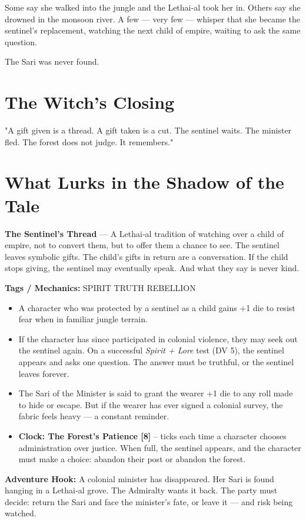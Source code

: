 \documentclass[10pt,twoside]{book}
\newcommand{\tag}[1]{\textsc{#1}}
\begin{document}
Some say she walked into the jungle and the Lethai‑al took her in. Others say she drowned in the monsoon river. A few --- very few --- whisper that she became the sentinel's replacement, watching the next child of empire, waiting to ask the same question.

The Sari was never found.

\section*{The Witch's Closing}
"A gift given is a thread. A gift taken is a cut. The sentinel waits. The minister fled. The forest does not judge. It remembers."

\section*{What Lurks in the Shadow of the Tale}
\begin{infobox}
\textbf{The Sentinel's Thread} --- A Lethai‑al tradition of watching over a child of empire, not to convert them, but to offer them a chance to see. The sentinel leaves symbolic gifts. The child's gifts in return are a conversation. If the child stops giving, the sentinel may eventually speak. And what they say is never kind.

\textbf{Tags / Mechanics:} \tag{SPIRIT} \tag{TRUTH} \tag{REBELLION}

\begin{itemize}
\item A character who was protected by a sentinel as a child gains +1 die to resist fear when in familiar jungle terrain.
\item If the character has since participated in colonial violence, they may seek out the sentinel again. On a successful \textit{Spirit + Lore} test (DV 5), the sentinel appears and asks one question. The answer must be truthful, or the sentinel leaves forever.
\item The Sari of the Minister is said to grant the wearer +1 die to any roll made to hide or escape. But if the wearer has ever signed a colonial survey, the fabric feels heavy --- a constant reminder.
\item \textbf{Clock: The Forest's Patience [8]} -- ticks each time a character chooses administration over justice. When full, the sentinel appears, and the character must make a choice: abandon their post or abandon the forest.
\end{itemize}

\textbf{Adventure Hook:} A colonial minister has disappeared. Her Sari is found hanging in a Lethai‑al grove. The Admiralty wants it back. The party must decide: return the Sari and face the minister's fate, or leave it --- and risk being watched.
\end{infobox}
\end{document}
